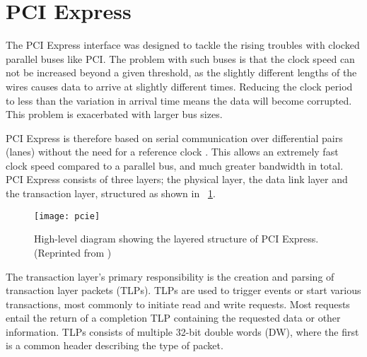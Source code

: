 
\section{PCI Express}

The PCI Express interface was designed to tackle the rising troubles with clocked parallel buses like PCI.
The problem with such buses is that the clock speed can not be increased beyond a given threshold, as the slightly different lengths of the wires causes data to arrive at slightly different times.
Reducing the clock period to less than the variation in arrival time means the data will become corrupted.
This problem is exacerbated with larger bus sizes.

PCI Express is therefore based on serial communication over differential pairs (lanes\footnotemark) without the need for a reference clock \cite{pcie}.
This allows an extremely fast clock speed compared to a parallel bus, and much greater bandwidth in total.
PCI Express consists of three layers; the physical layer, the data link layer and the transaction layer, structured as shown in \figurename~\ref{fig:pcie}.

\begin{figure}[!ht]
    \centering
    \texttt{[image: pcie]}
    \caption[PCI Express structure]{
        High-level diagram showing the layered structure of PCI Express. (Reprinted from \cite{pcie})
    }
    \label{fig:pcie}
\end{figure}

The transaction layer's primary responsibility is the creation and parsing of transaction layer packets (TLPs).
TLPs are used to trigger events or start various transactions, most commonly to initiate read and write requests\footnotemark.
Most requests entail the return of a completion TLP containing the requested data or other information.
TLPs consists of multiple 32-bit double words (DW), where the first is a common header describing the type of packet.

